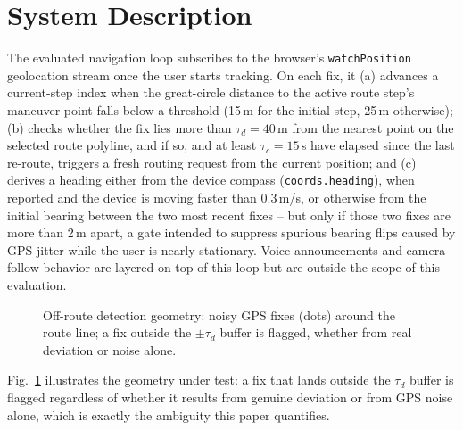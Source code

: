 \documentclass[conference]{IEEEtran}
\begin{document}
\section{System Description}
\label{sec:system}

The evaluated navigation loop subscribes to the browser's \texttt{watchPosition} geolocation stream once the user starts tracking. On each fix, it (a) advances a current-step index when the great-circle distance to the active route step's maneuver point falls below a threshold (15\,m for the initial step, 25\,m otherwise); (b) checks whether the fix lies more than $\tau_d = 40$\,m from the nearest point on the selected route polyline, and if so, and at least $\tau_c = 15$\,s have elapsed since the last re-route, triggers a fresh routing request from the current position; and (c) derives a heading either from the device compass (\texttt{coords.heading}), when reported and the device is moving faster than 0.3\,m/s, or otherwise from the initial bearing between the two most recent fixes -- but only if those two fixes are more than 2\,m apart, a gate intended to suppress spurious bearing flips caused by GPS jitter while the user is nearly stationary. Voice announcements and camera-follow behavior are layered on top of this loop but are outside the scope of this evaluation.

\begin{figure}[t]
\centering
{}
\caption{Off-route detection geometry: noisy GPS fixes (dots) around the route line; a fix outside the $\pm\tau_d$ buffer is flagged, whether from real deviation or noise alone.}
\label{fig:geometry}
\end{figure}

Fig.~\ref{fig:geometry} illustrates the geometry under test: a fix that lands outside the $\tau_d$ buffer is flagged regardless of whether it results from genuine deviation or from GPS noise alone, which is exactly the ambiguity this paper quantifies.
\end{document}
